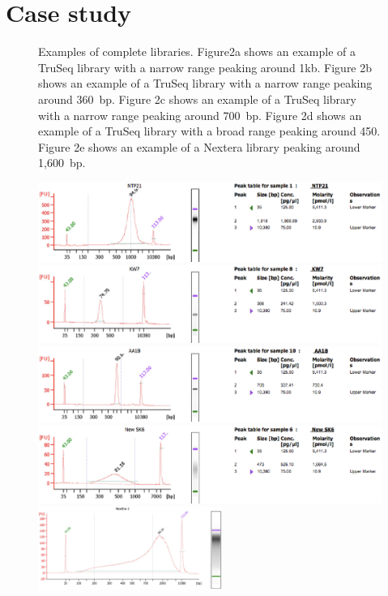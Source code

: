 \documentclass[graybox]{svmult}
\begin{document}
\section{Case study}
\label{sec:6}

%
\begin{figure}
\caption{Examples of complete libraries. Figure2a shows an example of a TruSeq library with a narrow range peaking around 1kb. Figure 2b shows an example of a TruSeq library with a narrow range peaking around 360~bp. Figure 2c shows an example of a TruSeq library with a narrow range peaking around 700~bp. Figure 2d shows an example of a TruSeq library with a broad range peaking around 450. Figure 2e shows an example of a Nextera library peaking around 1,600~bp.  }
\includegraphics[width=12cm]{imgs/image2.eps}
\includegraphics[width=12cm]{imgs/image3.eps}
\includegraphics[width=12cm]{imgs/image4.eps}
\includegraphics[width=12cm]{imgs/image5.eps}
\includegraphics[width=6cm]{imgs/image6.eps}
%
\caption{ }
\label{fig:2}       %
\end{figure}
\end{document}
